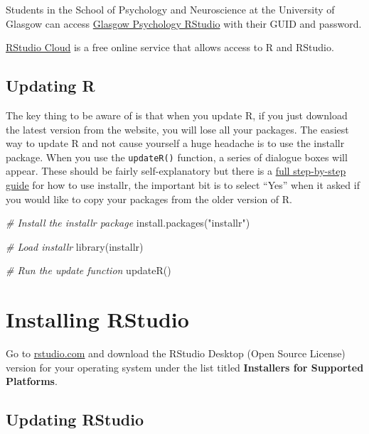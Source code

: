\documentclass[
  oneside]{book}
\newenvironment{Shaded}{\begin{snugshade}}{\end{snugshade}}
\newcommand{\CommentTok}[1]{\textcolor[rgb]{0.56,0.35,0.01}{\textit{#1}}}
\newcommand{\FunctionTok}[1]{\textcolor[rgb]{0.00,0.00,0.00}{#1}}
\newcommand{\NormalTok}[1]{#1}
\newcommand{\StringTok}[1]{\textcolor[rgb]{0.31,0.60,0.02}{#1}}
\begin{document}
Students in the School of Psychology and Neuroscience at the University of Glasgow can access \href{https://rstudio.psy.gla.ac.uk}{Glasgow Psychology RStudio} with their GUID and password.

\href{https://rstudio.cloud/}{RStudio Cloud} is a free online service that allows access to R and RStudio.

\hypertarget{updating-r}{%
\subsection{Updating R}\label{updating-r}}

The key thing to be aware of is that when you update R, if you just download the latest version from the website, you will lose all your packages. The easiest way to update R and not cause yourself a huge headache is to use the installr package. When you use the \texttt{updateR()} function, a series of dialogue boxes will appear. These should be fairly self-explanatory but there is a \href{https://www.r-statistics.com/2015/06/a-step-by-step-screenshots-tutorial-for-upgrading-r-on-windows/}{full step-by-step guide} for how to use installr, the important bit is to select ``Yes'' when it asked if you would like to copy your packages from the older version of R.

\begin{Shaded}
\begin{Highlighting}[]
\CommentTok{\# Install the installr package}
\FunctionTok{install.packages}\NormalTok{(}\StringTok{"installr"}\NormalTok{)}

\CommentTok{\# Load installr}
\FunctionTok{library}\NormalTok{(installr)}

\CommentTok{\# Run the update function}
\FunctionTok{updateR}\NormalTok{()}
\end{Highlighting}
\end{Shaded}

\hypertarget{installing-rstudio}{%
\section{Installing RStudio}\label{installing-rstudio}}

Go to \href{https://www.rstudio.com/products/rstudio/download/\#download}{rstudio.com} and download the RStudio Desktop (Open Source License) version for your operating system under the list titled \textbf{Installers for Supported Platforms}.

\hypertarget{updating-rstudio}{%
\subsection{Updating RStudio}\label{updating-rstudio}}
\end{document}

